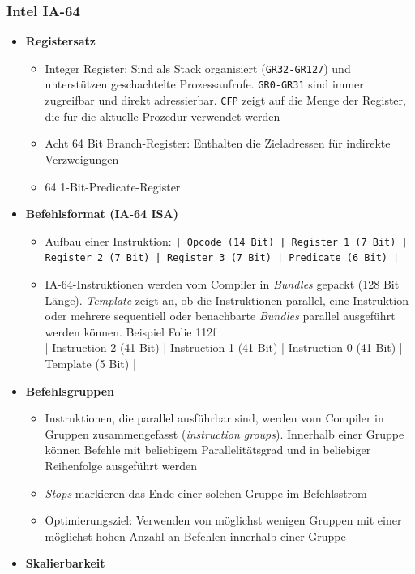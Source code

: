 \subsubsection{Intel IA-64}
\begin{itemize}
	\item \textbf{Registersatz}
	\begin{itemize}
		\item Integer Register: Sind als Stack organisiert (\texttt{GR32-GR127}) und unterstützen geschachtelte Prozessaufrufe. \texttt{GR0-GR31} sind immer zugreifbar und direkt adressierbar. \texttt{CFP} zeigt auf die Menge der Register, die für die aktuelle Prozedur verwendet werden
		\item Acht 64 Bit Branch-Register: Enthalten die Zieladressen für indirekte Verzweigungen
		\item 64 1-Bit-Predicate-Register
	\end{itemize}
	\item \textbf{Befehlsformat (IA-64 ISA)}
	\begin{itemize}
		\item Aufbau einer Instruktion: \texttt{| Opcode (14 Bit) | Register 1 (7 Bit) | Register 2 (7 Bit) | Register 3 (7 Bit) | Predicate (6 Bit) |}
		\item IA-64-Instruktionen werden vom Compiler in \textit{Bundles} gepackt (128 Bit Länge). \textit{Template} zeigt an, ob die Instruktionen parallel, eine Instruktion oder mehrere sequentiell oder benachbarte \textit{Bundles} parallel ausgeführt werden können. Beispiel Folie 112f \\ | Instruction 2 (41 Bit) | Instruction 1 (41 Bit) | Instruction 0 (41 Bit) | Template (5 Bit) |
	\end{itemize}
	\item \textbf{Befehlsgruppen}
	\begin{itemize}
		\item Instruktionen, die parallel ausführbar sind, werden vom Compiler in Gruppen zusammengefasst (\textit{instruction groups}). Innerhalb einer Gruppe können Befehle mit beliebigem Parallelitätsgrad und in beliebiger Reihenfolge ausgeführt werden
		\item \textit{Stops} markieren das Ende einer solchen Gruppe im Befehlsstrom
		\item Optimierungsziel: Verwenden von möglichst wenigen Gruppen mit einer möglichst hohen Anzahl an Befehlen innerhalb einer Gruppe
	\end{itemize}
	\item \textbf{Skalierbarkeit}

\end{itemize}
